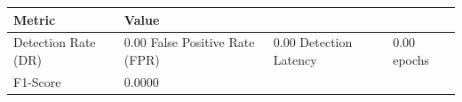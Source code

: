 \begin{tabular}{ll}
\toprule
Metric & Value \\
\midrule
Detection Rate (DR) & 0.00%
False Positive Rate (FPR) & 0.00%
Detection Latency & 0.00 epochs \\
F1-Score & 0.0000 \\
\bottomrule
\end{tabular}
